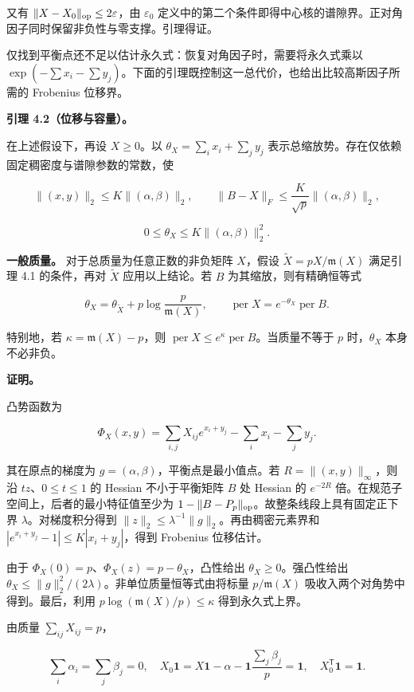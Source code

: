 \documentclass[11pt,a4paper]{article}
\begin{document}
又有 \(\|X-X_0\|_{\rm op}\le2\varepsilon\)，由 \(\varepsilon_0\) 定义中的第二个条件即得中心核的谱隙界。正对角因子同时保留非负性与零支撑。引理得证。

仅找到平衡点还不足以估计永久式：恢复对角因子时，需要将永久式乘以 \(\exp(-\sum x_i-\sum y_j)\)。下面的引理既控制这一总代价，也给出比较高斯因子所需的 Frobenius 位移界。

\textbf{引理 4.2（位移与容量）。}

在上述假设下，再设 \(X\ge0\)。以 \(\theta_X=\sum_i x_i+\sum_j y_j\) 表示总缩放势。存在仅依赖固定稠密度与谱隙参数的常数，使

\[
\|(x,y)\|_2\le K\|(\alpha,\beta)\|_2,\qquad \|B-X\|_F\le\frac K{\sqrt p}\|(\alpha,\beta)\|_2,
\]

\[
0\le\theta_X\le K\|(\alpha,\beta)\|_2^2.
\]

\textbf{一般质量。} 对于总质量为任意正数的非负矩阵 \(X\)，假设 \(\widetilde X=pX/\mathfrak m(X)\) 满足引理 4.1 的条件，再对 \(\widetilde X\) 应用以上结论。若 \(B\) 为其缩放，则有精确恒等式

\[
\theta_X=\theta_{\widetilde X}+p\log\frac p{\mathfrak m(X)},\qquad \operatorname{per}X=e^{-\theta_X}\operatorname{per}B.
\]

特别地，若 \(\kappa=\mathfrak m(X)-p\)，则 \(\operatorname{per}X\le e^\kappa\operatorname{per}B\)。当质量不等于 \(p\) 时，\(\theta_X\) 本身不必非负。

\textbf{证明。}

凸势函数为

\[
\Phi_X(x,y)=\sum_{i,j}X_{ij}e^{x_i+y_j}-\sum_i x_i-\sum_j y_j.
\]

其在原点的梯度为 \(g=(\alpha,\beta)\)，平衡点是最小值点。若 \(R=\|(x,y)\|_\infty\)，则沿 \(tz\)、\(0\le t\le1\) 的 Hessian 不小于平衡矩阵 \(B\) 处 Hessian 的 \(e^{-2R}\) 倍。在规范子空间上，后者的最小特征值至少为 \(1-\|B-P_p\|_{\rm op}\)。故整条线段上具有固定正下界 \(\lambda\)。对梯度积分得到 \(\|z\|_2\le\lambda^{-1}\|g\|_2\)。再由稠密元素界和 \(|e^{x_i+y_j}-1|\le K|x_i+y_j|\)，得到 Frobenius 位移估计。

由于 \(\Phi_X(0)=p\)、\(\Phi_X(z)=p-\theta_X\)，凸性给出 \(\theta_X\ge0\)。强凸性给出 \(\theta_X\le\|g\|_2^2/(2\lambda)\)。非单位质量恒等式由将标量 \(p/\mathfrak m(X)\) 吸收入两个对角势中得到。最后，利用 \(p\log(\mathfrak m(X)/p)\le\kappa\) 得到永久式上界。

由质量 \(\sum_{ij}X_{ij}=p\)，

\[
\sum_i\alpha_i=\sum_j\beta_j=0,
\quad X_0\mathbf1=X\mathbf1-\alpha-\mathbf1\frac{\sum_j\beta_j}p=\mathbf1,
\quad X_0^{\mathsf T}\mathbf1=\mathbf1.
\]
\end{document}
